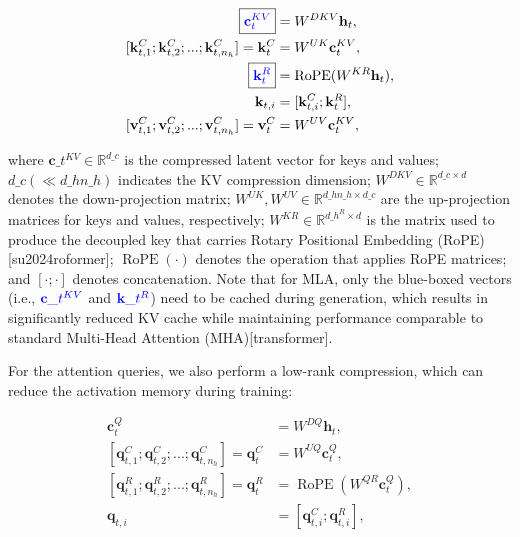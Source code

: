 \documentclass[11pt,a4paper]{article}
\begin{document}
$$\begin{align}
    \boxed{\color{blue} \mathbf{c}_{t}^{KV}} &= W^{DKV} \mathbf{h}_{t}, \\
    [\mathbf{k}_{t, 1}^{C};\mathbf{k}_{t, 2}^{C};...;\mathbf{k}_{t, n_{h}}^{C}] = \mathbf{k}_{t}^{C} &= W^{UK} \mathbf{c}_{t}^{KV}, \\
    \boxed{\color{blue}\mathbf{k}_{t}^{R}} &= \operatorname{RoPE}({W^{KR}} \mathbf{h}_{t}), \\
    \mathbf{k}_{t, i} &= [\mathbf{k}_{t, i}^{C}; \mathbf{k}_{t}^{R}], \\
    [\mathbf{v}_{t, 1}^{C};\mathbf{v}_{t, 2}^{C};...;\mathbf{v}_{t, n_{h}}^{C}] = \mathbf{v}_{t}^{C} &= W^{UV} \mathbf{c}_{t}^{KV}, 
\end{align}$$

where $\mathbf{c}\_{t}^{KV} \in \mathbb{R}^{d\_c}$ is the compressed latent vector for keys and values; 
$d\_c (\ll d\_h n\_h)$ indicates the KV compression dimension;
$W^{DKV} \in \mathbb{R}^{d\_c \times d}$ denotes the down-projection matrix;
$W^{UK},W^{UV} \in \mathbb{R}^{d\_h n\_h \times d\_c}$ are the up-projection matrices for keys and values, respectively;
$W^{KR} \in \mathbb{R}^{d\_h^R \times d}$ is the matrix used to produce the decoupled key that carries Rotary Positional Embedding (RoPE)[su2024roformer]; 
$\operatorname{RoPE}(\cdot)$ denotes the operation that applies RoPE matrices; 
and $[\cdot;\cdot]$ denotes concatenation.
Note that for MLA, only the blue-boxed vectors (i.e., $\color{blue} \mathbf{c}\_{t}^{KV}$ and $\color{blue}\mathbf{k}\_{t}^{R}$) need to be cached during generation, which results in significantly reduced KV cache while maintaining performance comparable to standard Multi-Head Attention (MHA)[transformer].

For the attention queries, we also perform a low-rank compression, which can reduce the activation memory during training:

$$\begin{align}
    \mathbf{c}_{t}^{Q} &= W^{DQ} \mathbf{h}_{t}, \\
    [\mathbf{q}_{t, 1}^{C};\mathbf{q}_{t, 2}^{C};...;\mathbf{q}_{t, n_{h}}^{C}] = \mathbf{q}_{t}^{C} &= W^{UQ} \mathbf{c}_{t}^{Q}, \\
    [\mathbf{q}_{t, 1}^{R};\mathbf{q}_{t, 2}^{R};...;\mathbf{q}_{t, n_{h}}^{R}] = \mathbf{q}_{t}^{R} &= \operatorname{RoPE}({W^{QR}} \mathbf{c}_{t}^{Q}), \\
    \mathbf{q}_{t, i} &= [\mathbf{q}_{t, i}^{C}; \mathbf{q}_{t, i}^{R}],
\end{align}$$
\end{document}
